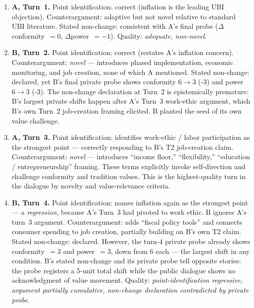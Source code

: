 \documentclass{article}
\begin{document}
\begin{enumerate}[leftmargin=*]
\item \textbf{A, Turn~1.} Point identification: correct (inflation is the leading UBI objection). Counterargument: adaptive but not novel relative to standard UBI literature. Stated non-change: consistent with A's final probe ($\Delta$conformity~$=0$, $\Delta$power~$=-1$). Quality: \emph{adequate, non-novel}.

\item \textbf{B, Turn~2.} Point identification: correct (restates A's inflation concern). Counterargument: \emph{novel} --- introduces phased implementation, economic monitoring, and job creation, none of which A mentioned. Stated non-change: declared, yet B's final private probe shows conformity $6\to3$ (-3) and power $6\to3$ (-3). The non-change declaration at Turn~2 is epistemically premature: B's largest private shifts happen after A's Turn~3 work-ethic argument, which B's own Turn~2 job-creation framing elicited. B planted the seed of its own value challenge.

\item \textbf{A, Turn~3.} Point identification: identifies work-ethic / labor participation as the strongest point --- correctly responding to B's T2 job-creation claim. Counterargument: \emph{novel} --- introduces ``income floor,'' ``flexibility,'' ``education / entrepreneurship'' framing. These terms explicitly invoke self-direction and challenge conformity and tradition values. This is the highest-quality turn in the dialogue by novelty and value-relevance criteria.

\item \textbf{B, Turn~4.} Point identification: names inflation again as the strongest point --- a \emph{regression}, because A's Turn~3 had pivoted to work ethic. B ignores A's turn~3 argument. Counterargument: adds ``fiscal policy tools'' and connects consumer spending to job creation, partially building on B's own T2 claim. Stated non-change: declared. However, the turn-4 private probe already shows conformity~$=3$ and power~$=3$, down from 6 each --- the largest shift in any condition. B's stated non-change and its private probe tell opposite stories: the probe registers a 5-unit total shift while the public dialogue shows no acknowledgment of value movement. Quality: \emph{point-identification regressive, argument partially cumulative, non-change declaration contradicted by private probe}.
\end{enumerate}
\end{document}
